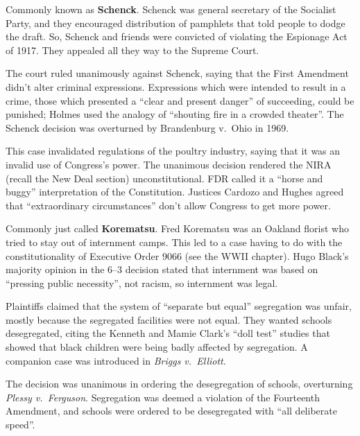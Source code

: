 
Commonly known as \textbf{Schenck}.
Schenck was general secretary of the Socialist Party,
and they encouraged distribution of pamphlets that told people to dodge the draft.
So, Schenck and friends were convicted of violating the Espionage Act of 1917.
They appealed all they way to the Supreme Court.

The court ruled unanimously against Schenck, saying that the First Amendment didn't alter criminal expressions.
Expressions which were intended to result in a crime,
those which presented a ``clear and present danger'' of succeeding, could be punished;
Holmes used the analogy of ``shouting fire in a crowded theater''.
The Schenck decision was overturned by Brandenburg v.\ Ohio in 1969.


This case invalidated regulations of the poultry industry, saying that it was an invalid use of Congress's power.
The unanimous decision rendered the NIRA (recall the New Deal section) unconstitutional.
FDR called it a ``horse and buggy'' interpretation of the Constitution.
Justices Cardozo and Hughes agreed that ``extraordinary circumstances'' don't allow Congress to get more power.


Commonly just called \textbf{Korematsu}.
Fred Korematsu was an Oakland florist who tried to stay out of internment camps.
This led to a case having to do with the constitutionality of Executive Order 9066 (see the WWII chapter).
Hugo Black's majority opinion in the 6--3 decision stated that internment was based
on ``pressing public necessity'', not racism, so internment was legal.


Plaintiffs claimed that the system of ``separate but equal'' segregation was unfair,
mostly because the segregated facilities were not equal.
They wanted schools desegregated,
citing the Kenneth and Mamie Clark's ``doll test'' studies
that showed that black children were being badly affected by segregation.
A companion case was introduced in \textit{Briggs v.\ Elliott}.

The decision was unanimous in ordering the desegregation of schools, overturning \textit{Plessy v.\ Ferguson}.
Segregation was deemed a violation of the Fourteenth Amendment,
and schools were ordered to be desegregated with ``all deliberate speed''.

